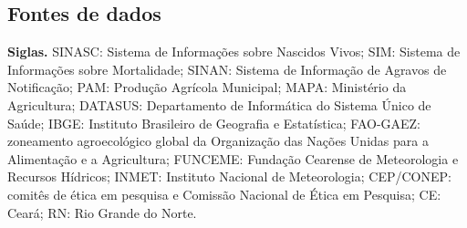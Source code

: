 
\begin{apendicesenv}
\clearpage
\chapter{Fontes de dados}
\label{ap:fontes}

\textbf{Siglas.} SINASC: Sistema de Informações sobre Nascidos Vivos; SIM: Sistema de Informações sobre Mortalidade; SINAN: Sistema de Informação de Agravos de Notificação; PAM: Produção Agrícola Municipal; MAPA: Ministério da Agricultura; DATASUS: Departamento de Informática do Sistema Único de Saúde; IBGE: Instituto Brasileiro de Geografia e Estatística; FAO-GAEZ: zoneamento agroecológico global da Organização das Nações Unidas para a Alimentação e a Agricultura; FUNCEME: Fundação Cearense de Meteorologia e Recursos Hídricos; INMET: Instituto Nacional de Meteorologia; CEP/CONEP: comitês de ética em pesquisa e Comissão Nacional de Ética em Pesquisa; CE: Ceará; RN: Rio Grande do Norte.


\end{apendicesenv}
